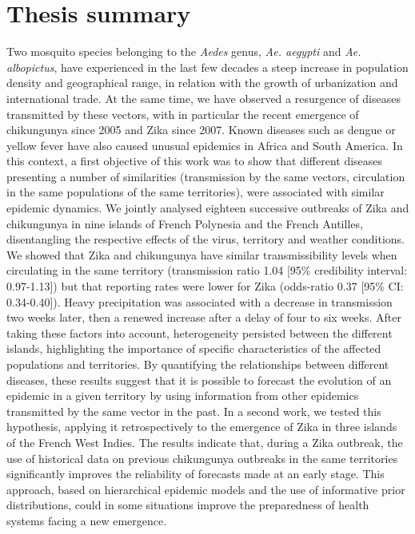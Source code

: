 \newpage
\chapter*{Thesis summary}
\vspace{2em}

Two mosquito species belonging to the {\em Aedes} genus, {\em Ae. aegypti} and {\em Ae. albopictus}, have experienced in the last few decades a steep increase in population density and geographical range, in relation with the growth of urbanization and international trade.
At the same time, we have observed a resurgence of diseases transmitted by these vectors, with in particular the recent emergence of chikungunya since 2005 and Zika since 2007.
Known diseases such as dengue or yellow fever have also caused unusual epidemics in Africa and South America.
In this context, a first objective of this work was to show that different diseases presenting a number of similarities (transmission by the same vectors, circulation in the same populations of the same territories), were associated with similar epidemic dynamics.
We jointly analysed eighteen successive outbreaks of Zika and chikungunya in nine islands of French Polynesia and the French Antilles, disentangling the respective effects of the virus, territory and weather conditions. 
We showed that Zika and chikungunya have similar transmissibility levels when circulating in the same territory (transmission ratio 1.04 [95\% credibility interval: 0.97-1.13]) but that reporting rates were lower for Zika (odds-ratio 0.37 [95\% CI: 0.34-0.40]). 
Heavy precipitation was associated with a decrease in transmission two weeks later, then a renewed increase after a delay of four to six weeks. 
After taking these factors into account, heterogeneity persisted between the different islands, highlighting the importance of specific characteristics of the affected populations and territories.
By quantifying the relationships between different diseases, these results suggest that it is possible to forecast the evolution of an epidemic in a given territory by using information from other epidemics transmitted by the same vector in the past. 
In a second work, we tested this hypothesis, applying it retrospectively to the emergence of Zika in three islands of the French West Indies.
The results indicate that, during a Zika outbreak, the use of historical data on previous chikungunya outbreaks in the same territories significantly improves the reliability of forecasts made at an early stage.
This approach, based on hierarchical epidemic models and the use of informative prior distributions, could in some situations improve the preparedness of health systems facing a new emergence.

